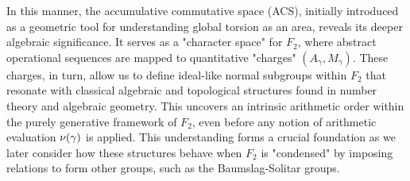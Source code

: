 In this manner, the accumulative commutative space (ACS), initially introduced as a geometric tool for understanding global torsion as an area, reveals its deeper algebraic significance. It serves as a "character space" for $F_2$, where abstract operational sequences are mapped to quantitative "charges" $(A_\gamma, M_\gamma)$. These charges, in turn, allow us to define ideal-like normal subgroups within $F_2$ that resonate with classical algebraic and topological structures found in number theory and algebraic geometry. This uncovers an intrinsic arithmetic order within the purely generative framework of $F_2$, even before any notion of arithmetic evaluation $\nu(\gamma)$ is applied. This understanding forms a crucial foundation as we later consider how these structures behave when $F_2$ is "condensed" by imposing relations to form other groups, such as the Baumslag-Solitar groups.


